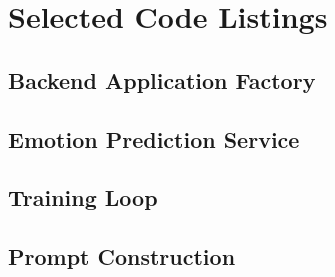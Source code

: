\chapter{Selected Code Listings}

\section{Backend Application Factory}

\section{Emotion Prediction Service}

\section{Training Loop}

\section{Prompt Construction}
